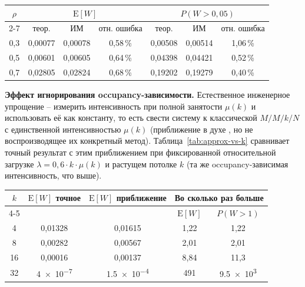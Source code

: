 \documentclass[12pt,a4paper]{article}
\begin{document}
\begin{center}
\label{tab:des}

\begin{tabular}{|c|c|c|c|c|c|c|}
\hline
\multirow{2}{*}{$\rho$} & \multicolumn{3}{c|}{$\mathrm{E}[W]$} & \multicolumn{3}{c|}{$P(W>0{,}05)$} \\
\cline{2-7}
 & теор. & ИМ & отн. ошибка & теор. & ИМ & отн. ошибка \\
\hline
0,3 & 0,00077 & 0,00078 & 0,58\,\% & 0,00508 & 0,00514 & 1,06\,\% \\
0,5 & 0,00601 & 0,00605 & 0,64\,\% & 0,04398 & 0,04421 & 0,52\,\% \\
0,7 & 0,02805 & 0,02824 & 0,68\,\% & 0,19202 & 0,19279 & 0,40\,\% \\
\hline
\end{tabular}
\end{center}

\noindent\textbf{Эффект игнорирования occupancy-зависимости.} Естественное инженерное упрощение -- измерить интенсивность при полной занятости $\mu(k)$ и использовать её как константу, то есть свести систему к классической $M/M/k/N$ с единственной интенсивностью $\mu(k)$ (приближение в духе \cite{ramani2026}, но не воспроизводящее их конкретный метод). Таблица~\ref{tab:approx-vs-k} сравнивает точный результат с этим приближением при фиксированной относительной загрузке $\lambda=0{,}6\cdot k\cdot\mu(k)$ и растущем потолке $k$ (та же occupancy-зависимая интенсивность, что выше).

\begin{center}
\label{tab:approx-vs-k}

\small
\begin{tabular}{|c|c|c|c|c|}
\hline
\multirow{2}{*}{$k$} & \multirow{2}{*}{$\mathrm{E}[W]$ точное} & \multirow{2}{*}{$\mathrm{E}[W]$ приближение} & \multicolumn{2}{c|}{Во сколько раз больше} \\
\cline{4-5}
 & & & $\mathrm{E}[W]$ & $P(W>1)$ \\
\hline
4  & 0,01328 & 0,01615  & 1,22  & 1,22 \\
8  & 0,00282 & 0,00567  & 2,01  & 2,01 \\
16 & 0,00016 & 0,00137  & 8,84  & 11,3 \\
32 & \num{4e-7} & \num{1.5e-4} & 491 & \num{9.5e3} \\
\hline
\end{tabular}
\end{center}
\end{document}
